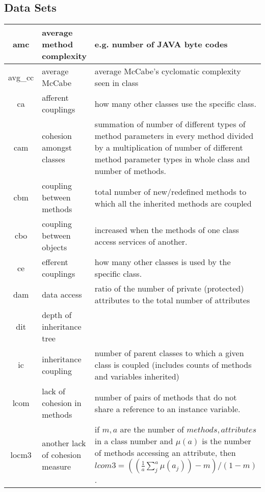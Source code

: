 \documentclass[12pt, journal, compsoc]{IEEEtran}
\begin{document}
\subsection{Data Sets}
\begin{figure*}[htbp!]
  \renewcommand{\baselinestretch}{1}\begin{center}
    {\scriptsize
      \begin{tabular}{c|l|p{4.7in}}
        amc & average method complexity & e.g. number of JAVA byte codes\\\hline
        avg\_cc & average McCabe & average McCabe's cyclomatic complexity seen
        in class\\\hline
        ca & afferent couplings & how many other classes use the specific
        class. \\\hline
        cam & cohesion amongst classes & summation of number of different
        types of method parameters in every method divided by a multiplication
        of number of different method parameter types in whole class and
        number of methods. \\\hline
        cbm &coupling between methods &  total number of new/redefined methods
        to which all the inherited methods are coupled\\\hline
        cbo & coupling between objects & increased when the methods of one
        class access services of another.\\\hline
        ce & efferent couplings & how many other classes is used by the
        specific class. \\\hline
        dam & data access & ratio of the number of private (protected)
        attributes to the total number of attributes\\\hline
        dit & depth of inheritance tree &\\\hline
        ic & inheritance coupling &  number of parent classes to which a given
        class is coupled (includes counts of methods and variables inherited)
        \\\hline
        lcom & lack of cohesion in methods &number of pairs of methods that do
        not share a reference to an instance variable.\\\hline
        locm3 & another lack of cohesion measure & if $m,a$ are  the number of
        $methods,attributes$
        in a class number and $\mu(a)$  is the number of methods accessing an
        attribute, 
        then
        $lcom3=((\frac{1}{a} \sum_j^a \mu(a_j)) - m)/ (1-m)$.
        \\\hline

\end{tabular}}
\end{center}
\end{figure*}
\end{document}
